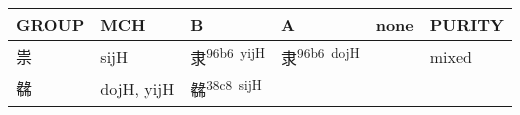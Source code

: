\documentclass[14pt,a4paper]{scrartcl}
\begin{document}
\begin{longtable}[c]{@{}llllll@{}}
\toprule
\begin{minipage}[b]{0.14\columnwidth}\raggedright\strut
GROUP
\strut\end{minipage} &
\begin{minipage}[b]{0.14\columnwidth}\raggedright\strut
MCH
\strut\end{minipage} &
\begin{minipage}[b]{0.14\columnwidth}\raggedright\strut
B
\strut\end{minipage} &
\begin{minipage}[b]{0.14\columnwidth}\raggedright\strut
A
\strut\end{minipage} &
\begin{minipage}[b]{0.14\columnwidth}\raggedright\strut
none
\strut\end{minipage} &
\begin{minipage}[b]{0.14\columnwidth}\raggedright\strut
PURITY
\strut\end{minipage}\tabularnewline
\midrule
\endhead
\begin{minipage}[t]{0.14\columnwidth}\raggedright\strut
祟
\strut\end{minipage} &
\begin{minipage}[t]{0.14\columnwidth}\raggedright\strut
sijH
\strut\end{minipage} &
\begin{minipage}[t]{0.14\columnwidth}\raggedright\strut
隶\textsuperscript{96b6~yijH}
\strut\end{minipage} &
\begin{minipage}[t]{0.14\columnwidth}\raggedright\strut
隶\textsuperscript{96b6~dojH}
\strut\end{minipage} &
\begin{minipage}[t]{0.14\columnwidth}\raggedright\strut
\strut\end{minipage} &
\begin{minipage}[t]{0.14\columnwidth}\raggedright\strut
mixed
\strut\end{minipage}\tabularnewline
\begin{minipage}[t]{0.14\columnwidth}\raggedright\strut
㣈
\strut\end{minipage} &
\begin{minipage}[t]{0.14\columnwidth}\raggedright\strut
dojH, yijH
\strut\end{minipage} &
\begin{minipage}[t]{0.14\columnwidth}\raggedright\strut
㣈\textsuperscript{38c8~sijH}
\strut\end{minipage} &

\end{longtable}
\end{document}
